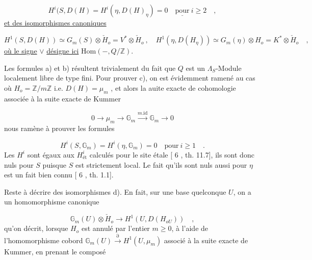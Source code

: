 \begin{equation}\tag{c)}
H^i(S,D(H) = H^i(\eta,D(H)_\eta) = 0 \quad \underline{\text{pour}}\ i \geq 2 \quad ,
\end{equation}
\underline{et des isomorphismes canoniques}

\begin{equation}\tag{d)}
H^1(S,D(H)) \simeq G_m(S)\otimes \check{H}_o = V^*\otimes \check{H}_o \ , \quad H^1(\eta,D(H_\eta)) \simeq G_m(\eta) \otimes H_o = K^*\otimes \check{H}_o \quad ,
\end{equation}
\underline{où le signe} $\vee$ \underline{désigne ici} $\mathrm{Hom}( - , Q/\mathbb{Z} )$.

Les formules a) et b) résultent trivialement du fait que $Q$ est un $\Lambda_S$-Module localement libre de type fini. Pour prouver c), on est évidemment ramené au cas où $H_o = \mathbb{Z}/m\mathbb{Z}$ i.e. $D(H) = \mu_m$ , et alors la auite exacte de cohomologie associée à la suite exacte de Kummer

\begin{equation*}
0 \longrightarrow \mu_m \longrightarrow \mathbb{G}_m \overset{m.\mathrm{id}}{\longrightarrow} \mathbb{G}_m \longrightarrow 0
\end{equation*}
nous ramène à prouver les formules

\begin{equation*}
H^i(S,\mathbb{G}_m) = H^i(\eta,\mathbb{G}_m) = 0 \quad \text{pour}\ i \geq 1 \quad .
\end{equation*}
Les $H^i$ sont égaux aux $H^i_{\text{ét}}$ calculés pour le site étale [ 6 , th. 11.7], ils sont donc nuls pour $S$ puisque $S$ est strictement local. Le fait qu'ils sont nuls aussi pour $\eta$ est un fait bien connu [ 6 , th. 1.1].



Reste à décrire des isomorphismes d). En fait, sur une base quelconque $U$, on a un homomorphisme canonique

\begin{equation}\tag{9.4.3.1}
\mathbb{G}_m(U) \otimes \check{H}_o \longrightarrow H^1(U,D(H_{oU})) \quad ,
\end{equation}
qu'on décrit, lorsque $H_o$ est annulé par l'entier $m \geqslant 0$, à l'aide de l'homomorphisme cobord $\mathbb{G}_m(U) \stackrel{\partial}{\longrightarrow} H^1(U,\mu_m)$ associé à la suite exacte de Kummer, en prenant le composé


